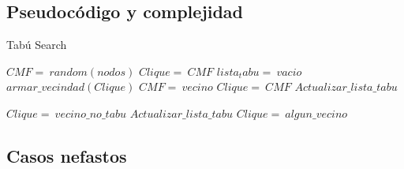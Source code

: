 \subsection{Pseudoc\'odigo y complejidad}
\begin{algorithm}
	\caption{Tabú Search}\label{tabu}
	\begin{algorithmic}[1]
		\State $CMF=\ random(nodos)$	
		\State $Clique=\ CMF$
		\State $lista_tabu=\ vacio$
			\State $armar\_vecindad(Clique)$
				 
					\State $CMF=\ vecino$
					\State $Clique=\ CMF$ 
					\State $Actualizar\_lista\_tabu$
				\EndIf
			\EndFor
		\EndWhile

				\State $Clique=\ vecino\_no\_tabu$
				\State $Actualizar\_lista\_tabu$
			\Else
				\State $Clique=\ algun\_vecino$
			\EndIf
		\EndIf
	\EndProcedure
\end{algorithmic}
\end{algorithm}


\subsection{Casos nefastos}






